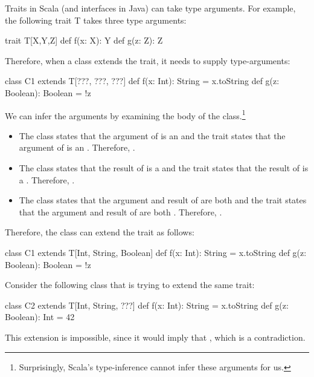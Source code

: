 \documentclass{book}
\begin{document}
Traits in Scala (and interfaces in Java) can take type arguments.
For example, the following trait T takes three type arguments:
\begin{scalacode}
trait T[X,Y,Z] {
  def f(x: X): Y
  def g(z: Z): Z
}
\end{scalacode}
Therefore, when a class extends the trait, it needs to supply type-arguments:
\begin{scalacode}
class C1 extends T[???, ???, ???] {
  def f(x: Int): String = x.toString
  def g(z: Boolean): Boolean = !z
}
\end{scalacode}
We can infer the arguments by examining the body of the
class.\footnote{Surprisingly, Scala's type-inference cannot infer these arguments for us.}
\begin{itemize}
  \item The class states that the argument of  is an 
  and the trait states that the argument of  is an .
  Therefore, .

  \item The class states that the result of  is a 
  and the trait states that the result of  is a .
  Therefore, .

  \item The class states that the argument and result of  are both 
  and the trait states that the argument and result of  are both .
  Therefore, .
\end{itemize}
Therefore, the class can extend the trait as follows:
\begin{scalacode}
class C1 extends T[Int, String, Boolean] {
  def f(x: Int): String = x.toString
  def g(z: Boolean): Boolean = !z
}
\end{scalacode}

Consider the following class that is trying to extend the same trait:
\begin{scalacode}
class C2 extends T[Int, String, ???] {
  def f(x: Int): String = x.toString
  def g(z: Boolean): Int = 42
}
\end{scalacode}
This extension is impossible, since it would imply that , which
is a contradiction.
\end{document}
